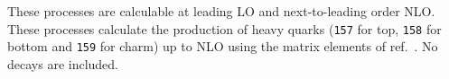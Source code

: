 These processes are calculable at leading LO and next-to-leading order NLO.
These processes calculate the production of heavy quarks
({\tt 157} for top, {\tt 158} for bottom and {\tt 159} for charm) up to NLO
using the matrix elements of ref.~\cite{Nason:1987xz}. No decays
are included.
